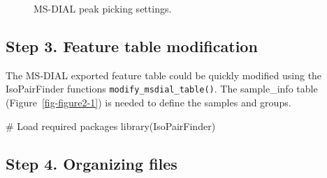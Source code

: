 \documentclass[
  letterpaper,
  DIV=11,
  numbers=noendperiod]{scrreprt}
\newenvironment{Shaded}{\begin{snugshade}}{\end{snugshade}}
\newcommand{\CommentTok}[1]{\textcolor[rgb]{0.37,0.37,0.37}{#1}}
\newcommand{\FunctionTok}[1]{\textcolor[rgb]{0.28,0.35,0.67}{#1}}
\newcommand{\NormalTok}[1]{\textcolor[rgb]{0.00,0.23,0.31}{#1}}
\begin{document}
\begin{figure}


\caption{\label{fig-figure2-4}MS-DIAL peak picking settings.}

\end{figure}%

\subsection{Step 3. Feature table
modification}\label{step-3.-feature-table-modification-1}

The MS-DIAL exported feature table could be quickly modified using the
IsoPairFinder functions \texttt{modify\_msdial\_table()}. The
sample\_info table (Figure~\ref{fig-figure2-1}) is needed to define the
samples and groups.

\begin{Shaded}
\begin{Highlighting}[]
\CommentTok{\# Load required packages}
\FunctionTok{library}\NormalTok{(IsoPairFinder)}
\end{Highlighting}
\end{Shaded}

\subsection{Step 4. Organizing files}\label{step-4.-organizing-files-1}
\end{document}
